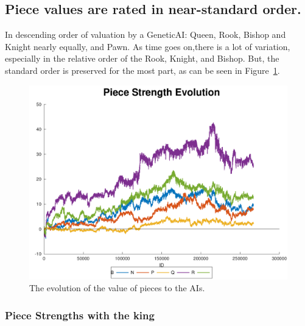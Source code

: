 \documentclass[letterpaper]{article}
\renewcommand{\_}{\allowbreak\textunderscore\allowbreak}
\begin{document}
\subsection{Piece values are rated in near-standard order.}
In descending order of valuation by a Genetic\_AI\@: Queen, Rook, Bishop and Knight nearly equally, and Pawn. As time goes on,there is a lot of variation, especially in the relative order of the Rook, Knight, and Bishop. But, the standard order is preserved for the most part, as can be seen in Figure~\ref{piece-value-plot}.
\begin{figure}[htb]
	\centering
	\includegraphics[width=\textwidth]{pawn-crash-strength-plot}
	\caption{The evolution of the value of pieces to the AIs.}\label{piece-value-plot}
\end{figure}

\subsubsection{Piece Strengths with the king}\label{piece-strength-with-king}
\end{document}
